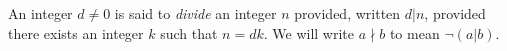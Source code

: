 \guard


\begin{defn}
\label{defn:divide}
  An integer $d\not=0$ is said to \emph{divide} an integer $n$ provided, written $d|n$, provided there exists an integer $k$ such that $n=dk$.
  We will write $a\nmid b$ to mean $\neg(a|b)$.
\end{defn}

